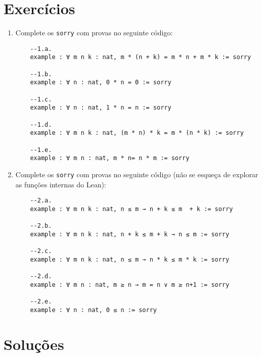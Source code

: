\section{Exercícios}

\begin{enumerate}
    \item Complete os \lstinline{sorry} com provas no seguinte código:
    
    \begin{lstlisting}
    --1.a.
    example : ∀ m n k : nat, m * (n + k) = m * n + m * k := sorry
    
    --1.b.
    example : ∀ n : nat, 0 * n = 0 := sorry
    
    --1.c.
    example : ∀ n : nat, 1 * n = n := sorry
    
    --1.d.
    example : ∀ m n k : nat, (m * n) * k = m * (n * k) := sorry
    
    --1.e.
    example : ∀ m n : nat, m * n= n * m := sorry
    \end{lstlisting}
    
    \item Complete os \lstinline{sorry} com provas no seguinte código (não se esqueça de explorar as funções internas do Lean):
    
    \begin{lstlisting}
    --2.a.
    example : ∀ m n k : nat, n ≤ m → n + k ≤ m  + k := sorry
    
    --2.b.
    example : ∀ m n k : nat, n + k ≤ m + k → n ≤ m := sorry
    
    --2.c.
    example : ∀ m n k : nat, n ≤ m → n * k ≤ m * k := sorry
    
    --2.d.
    example : ∀ m n : nat, m ≥ n → m = n ∨ m ≥ n+1 := sorry
    
    --2.e.
    example : ∀ n : nat, 0 ≤ n := sorry
    \end{lstlisting}
\end{enumerate}

\section{Soluções}

